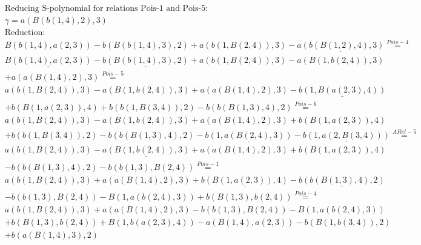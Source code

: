 \documentclass[11pt]{amsart}
\begin{document}
\begin{align*} 
& \text{Reducing S-polynomial for relations Pois-1 and Pois-5:} \\ 
& \gamma = a(B(b(1,4),2),3) \\ 
& \text{Reduction}: \\&B(b(1,4),a(2,3)) - b(B(b(1,4),3),2) + a(b(1,B(2,4)),3) - \underline{a(b(B(1,2),4),3)} \stackrel{ Pois-4 }{=}  \\ 
&\underline{B(b(1,4),a(2,3))} - \underline{b(B(b(1,4),3),2)} + a(b(1,B(2,4)),3) - a(B(1,b(2,4)),3)\\ 
 &  + a(a(B(1,4),2),3) \stackrel{ Pois-5 }{=}  \\ 
&a(b(1,B(2,4)),3) - a(B(1,b(2,4)),3) + a(a(B(1,4),2),3) - \underline{b(1,B(a(2,3),4))}\\ 
 &  + b(B(1,a(2,3)),4) + b(b(1,B(3,4)),2) - b(b(B(1,3),4),2) \stackrel{ Pois-6 }{=}  \\ 
&a(b(1,B(2,4)),3) - a(B(1,b(2,4)),3) + a(a(B(1,4),2),3) + b(B(1,a(2,3)),4)\\ 
 &  + b(b(1,B(3,4)),2) - b(b(B(1,3),4),2) - \underline{b(1,a(B(2,4),3))} - \underline{b(1,a(2,B(3,4)))} \stackrel{ ARel-5 }{=}  \\ 
&a(b(1,B(2,4)),3) - \underline{a(B(1,b(2,4)),3)} + a(a(B(1,4),2),3) + b(B(1,a(2,3)),4)\\ 
 &  - b(b(B(1,3),4),2) - b(b(1,3),B(2,4)) \stackrel{ Pois-1 }{=}  \\ 
&a(b(1,B(2,4)),3) + a(a(B(1,4),2),3) + \underline{b(B(1,a(2,3)),4)} - \underline{b(b(B(1,3),4),2)}\\ 
 &  - b(b(1,3),B(2,4)) - B(1,a(b(2,4),3)) + b(B(1,3),b(2,4)) \stackrel{ Pois-4 }{=}  \\ 
&a(b(1,B(2,4)),3) + a(a(B(1,4),2),3) - b(b(1,3),B(2,4)) - B(1,a(b(2,4),3))\\ 
 &  + b(B(1,3),b(2,4)) + B(1,b(a(2,3),4)) - a(B(1,4),a(2,3)) - b(B(1,b(3,4)),2)\\ 
 &  + b(a(B(1,4),3),2)\\ 
\end{align*} 
 
\end{document}
